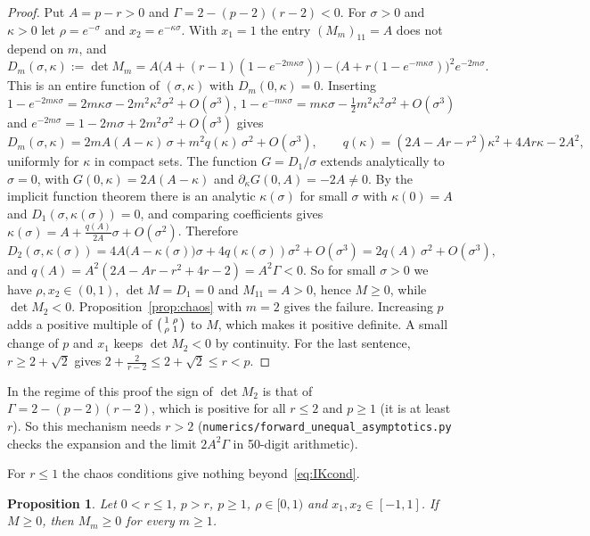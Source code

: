 \documentclass[11pt]{amsart}
\newtheorem{proposition}[theorem]{Proposition}
\theoremstyle{definition}
\begin{document}
\begin{proof}
Put $A=p-r>0$ and $\Gamma=2-(p-2)(r-2)<0$. For $\sigma>0$ and $\kappa>0$ let $\rho=e^{-\sigma}$ and
$x_2=e^{-\kappa\sigma}$. With $x_1=1$ the entry $(M_m)_{11}=A$ does not depend on $m$, and
\[
D_m(\sigma,\kappa):=\det M_m=A\big(A+(r-1)(1-e^{-2m\kappa\sigma})\big)-\big(A+r(1-e^{-m\kappa\sigma})\big)^2e^{-2m\sigma}.
\]
This is an entire function of $(\sigma,\kappa)$ with $D_m(0,\kappa)=0$. Inserting
$1-e^{-2m\kappa\sigma}=2m\kappa\sigma-2m^2\kappa^2\sigma^2+O(\sigma^3)$,
$1-e^{-m\kappa\sigma}=m\kappa\sigma-\frac12m^2\kappa^2\sigma^2+O(\sigma^3)$ and
$e^{-2m\sigma}=1-2m\sigma+2m^2\sigma^2+O(\sigma^3)$ gives
\[
D_m(\sigma,\kappa)=2mA(A-\kappa)\,\sigma+m^2q(\kappa)\,\sigma^2+O(\sigma^3),\qquad
q(\kappa)=(2A-Ar-r^2)\kappa^2+4Ar\kappa-2A^2,
\]
uniformly for $\kappa$ in compact sets. The function $G=D_1/\sigma$ extends analytically to $\sigma=0$, with
$G(0,\kappa)=2A(A-\kappa)$ and $\partial_\kappa G(0,A)=-2A\ne0$. By the implicit function theorem there is an
analytic $\kappa(\sigma)$ for small $\sigma$ with $\kappa(0)=A$ and $D_1(\sigma,\kappa(\sigma))=0$, and comparing
coefficients gives $\kappa(\sigma)=A+\frac{q(A)}{2A}\sigma+O(\sigma^2)$. Therefore
\[
D_2(\sigma,\kappa(\sigma))=4A\big(A-\kappa(\sigma)\big)\sigma+4q(\kappa(\sigma))\sigma^2+O(\sigma^3)
=2q(A)\,\sigma^2+O(\sigma^3),
\]
and $q(A)=A^2(2A-Ar-r^2+4r-2)=A^2\Gamma<0$. So for small $\sigma>0$ we have $\rho,x_2\in(0,1)$, $\det M=D_1=0$ and
$M_{11}=A>0$, hence $M\ge0$, while $\det M_2<0$. Proposition~\ref{prop:chaos} with $m=2$ gives the failure. Increasing
$p$ adds a positive multiple of $\begin{psmallmatrix}1&\rho\\\rho&1\end{psmallmatrix}$ to $M$, which makes it positive
definite. A small change of $p$ and $x_1$ keeps $\det M_2<0$ by continuity. For the last sentence,
$r\ge2+\sqrt2$ gives $2+\frac2{r-2}\le2+\sqrt2\le r<p$.
\end{proof}

In the regime of this proof the sign of $\det M_2$ is that of $\Gamma=2-(p-2)(r-2)$, which is positive for all $r\le2$
and $p\ge1$ (it is at least $r$). So this mechanism needs $r>2$ (\texttt{numerics/forward\_unequal\_asymptotics.py}
checks the expansion and the limit $2A^2\Gamma$ in 50-digit arithmetic).

For $r\le1$ the chaos conditions give nothing beyond~\eqref{eq:IKcond}.

\begin{proposition}\label{prop:local}
Let $0<r\le1$, $p>r$, $p\ge1$, $\rho\in[0,1)$ and $x_1,x_2\in[-1,1]$. If $M\ge0$, then $M_m\ge0$ for every $m\ge1$.
\end{proposition}
\end{document}
